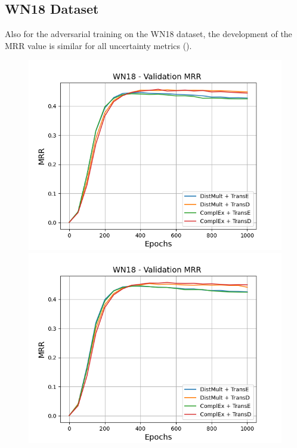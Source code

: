 \subsection{WN18 Dataset}
\label{subsec:metrics_wn18}

Also for the adversarial training on the WN18 dataset, the development of the MRR value is similar for all uncertainty metrics ().
\begin{figure}
    \centering
    \begin{minipage}{.5\textwidth}
      \centering
      \includegraphics[width=0.9\linewidth]{figures/results/gan_train/not_pretrained/uncertainty/max_distribution/entropy/wn18/uncertainty_wn18_mrrs.png}
    \end{minipage}%
    \begin{minipage}{.5\textwidth}
      \centering
      \includegraphics[width=0.9\linewidth]{figures/results/gan_train/not_pretrained/uncertainty/max_distribution/least_confidence/wn18/uncertainty_wn18_mrrs.png}

\end{minipage}
\end{figure}
